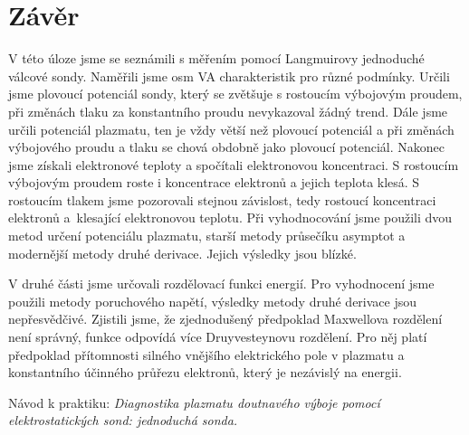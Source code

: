 \documentclass[a4paper,12pt]{article}
\begin{document}
\clearpage
\section{Závěr}
V této úloze jsme se seznámili s měřením pomocí Langmuirovy jednoduché válcové sondy. Naměřili jsme osm VA charakteristik pro různé
podmínky. Určili jsme plovoucí potenciál sondy, který se zvětšuje s rostoucím výbojovým proudem, při změnách tlaku za konstantního
proudu nevykazoval žádný trend. Dále jsme určili potenciál plazmatu, ten je vždy větší než plovoucí potenciál a při změnách výbojového
proudu a tlaku se chová obdobně jako plovoucí potenciál. Nakonec jsme získali elektronové teploty a spočítali elektronovou koncentraci. S rostoucím výbojovým
proudem roste i koncentrace elektronů a jejich teplota klesá. S rostoucím tlakem jsme pozorovali stejnou závislost, tedy rostoucí
koncentraci elektronů a~klesající elektronovou teplotu. Při vyhodnocování jsme 
použili dvou metod určení potenciálu plazmatu, starší metody průsečíku asymptot 
a modernější metody druhé derivace. Jejich výsledky jsou blízké.

V druhé části jsme určovali rozdělovací funkci energií. Pro vyhodnocení jsme 
použili metody poruchového napětí, výsledky metody druhé derivace jsou 
nepřesvědčivé. Zjistili jsme, že zjednodušený předpoklad 
Maxwellova rozdělení není správný, funkce odpovídá více Druyvesteynovu rozdělení. 
Pro něj platí předpoklad přítomnosti silného vnějšího elektrického pole v plazmatu
a konstantního účinného průřezu elektronů, který je nezávislý na energii.

\begin{thebibliography}{10}
	 Návod k praktiku: \textit{Diagnostika plazmatu doutnavého výboje pomocí 
	elektrostatických sond: jednoduchá sonda.}

\end{thebibliography}
\end{document}
